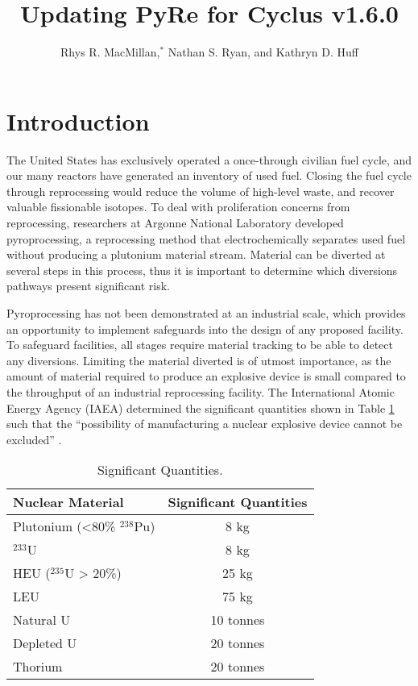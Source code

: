 \documentclass{anstrans}
\title{Updating PyRe for Cyclus v1.6.0}
\author{Rhys R. MacMillan,$^{*}$ Nathan S. Ryan, and Kathryn D. Huff}
\institute{
Advanced Reactors and Fuel Cycles Group, University of Illinois, Urbana IL\\
$^{*}$rhysrm2@illinois.edu
}
\begin{document}
\section{Introduction}
The United States has exclusively operated a once-through civilian fuel cycle, and our many reactors have generated an inventory of used fuel. Closing the fuel cycle through reprocessing would reduce the volume of high-level waste, and recover valuable fissionable isotopes. To deal with proliferation concerns from reprocessing, researchers at Argonne National Laboratory developed pyroprocessing, a reprocessing method that electrochemically separates used fuel without producing a plutonium material stream. Material can be diverted at several steps in this process, thus it is important to determine which diversions pathways present significant risk.

Pyroprocessing has not been demonstrated at an industrial scale, which provides an opportunity to implement safeguards into the design of any proposed facility. To safeguard facilities, all stages require material tracking to be able to detect any diversions. Limiting the material diverted is of utmost importance, as the amount of material required to produce an explosive device is small compared to the throughput of an industrial reprocessing facility. The International Atomic Energy Agency (IAEA) determined the significant quantities shown in Table \ref{tab:sig_quant} such that the “possibility of manufacturing a nuclear explosive device cannot be excluded” \cite{schanfein_iaea_2021}.

\begin{table}[H]
  \centering
  \caption{Significant Quantities.}
  \label{tab:sig_quant}
  \begin{tabular}{l c}
    \hline
    Nuclear Material&Significant Quantities\\
    \hline
    Plutonium (<80\% $^{238}$Pu)&8 kg\\
    $^{233}$U&8 kg\\
    HEU ($^{235}$U > 20\%)&25 kg\\
    LEU&75 kg\\
    Natural U&10 tonnes\\
    Depleted U&20 tonnes\\
    Thorium&20 tonnes\\
    \hline
  \end{tabular}
\end{table}
\end{document}
